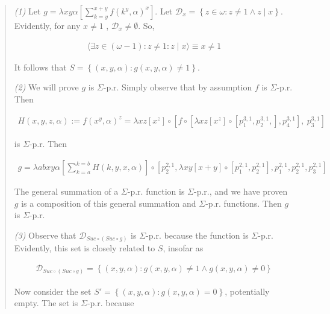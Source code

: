 \documentclass[a4paper, 12pt]{article}
\begin{document}
\small
\begin{quote}


\textit{(1)} Let $g = \lambda xy \alpha \left[ \sum_{k=y}^{x + y}f(k^y, \alpha)^x  \right]$.
Let $\mathscr{D}_x = \left\{ z \in \omega : z \neq 1 \land z \mid x \right\} $.
Evidently, for any $x \neq 1$ , $\mathscr{D}_x \neq \emptyset$.  So,

\begin{align*}
    \langle \exists z \in \left( \omega - 1 \right)  :  z \neq 1 : z \mid x
    \rangle \equiv x \neq 1
\end{align*}

It follows that $S = \left\{ (x, y, \alpha) : g(x, y, \alpha) \neq 1 \right\} $. 

\textit{(2)} We will prove $g$ is $\Sigma$-p.r. Simply observe that by
assumption $f$ is $\Sigma$-p.r. Then 

\begin{align*}
    H(x, y, z, \alpha) := f(x^y, \alpha)^z  = \lambda xz \left[ x^z  \right] \circ \left[ f \circ
    \left[ \lambda xz \left[  x^z \right] \circ \left[ p_1^{3, 1}, p_2^{3, 1},
\right], p_4^{3, 1}  \right], ~ p_3^{3, 1} \right] 
\end{align*}

is $\Sigma$-p.r. Then

\begin{align*}
    g = \lambda abxy\alpha \left[ \sum_{k=a}^{k = b} H(k, y, x, \alpha)  \right] \circ
    \left[ p_2^{2, 1}, \lambda xy \left[ x + y  \right] \circ \left[ p_1^{2, 1},
    p_2^{2, 1}\right], p_1^{2, 1}, p_2^{2, 1}, p_3^{2, 1}    \right] 
\end{align*}

The general summation of a $\Sigma$-p.r. function is $\Sigma$-p.r., and we have
proven $g$ is a composition of this general summation and $\Sigma$-p.r.
functions. Then $g$ is $\Sigma$-p.r. 

\textit{(3)} Observe that $\mathcal{D}_{Suc \circ (Suc \circ g)}$ is
$\Sigma$-p.r. because the function is $\Sigma$-p.r. Evidently, this set is
closely related to $S$, insofar as

    \begin{align*}
        \mathcal{D}_{Suc \circ (Suc \circ g)} = \left\{ (x, y, \alpha) : g(x, y,
        \alpha) \neq 1 \land g(x, y, \alpha) \neq 0 \right\} 
    \end{align*}


Now consider the set $S' = \left\{ (x, y, \alpha) : g(x, y, \alpha) = 0 \right\}
$, potentially empty. The set is $\Sigma$-p.r. because


\end{quote}
\end{document}

